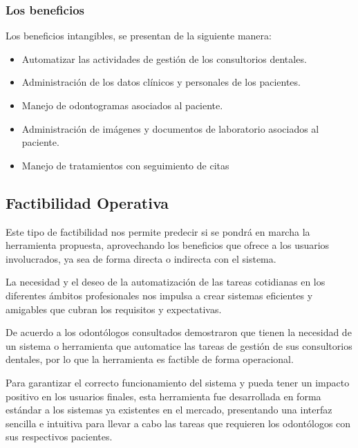 \subsubsection{Los beneficios}
\noindent
Los beneficios intangibles, se presentan de la siguiente manera:
\begin{itemize}
    \item Automatizar las actividades de gestión de los consultorios dentales.
    \item Administración de los datos clínicos y personales de los pacientes.
    \item Manejo de odontogramas asociados al paciente.
    \item Administración de imágenes y documentos de laboratorio asociados al paciente.
    \item Manejo de tratamientos con seguimiento de citas
\end{itemize}

\subsection{Factibilidad Operativa}
\noindent
Este tipo de factibilidad nos permite predecir si se pondrá en marcha la herramienta propuesta, aprovechando los beneficios que ofrece a los usuarios involucrados, ya sea de forma directa o indirecta con el sistema.

\vspace{1em}

La necesidad y el deseo de la automatización de las tareas cotidianas en los diferentes ámbitos profesionales nos impulsa a crear sistemas eficientes y amigables que cubran los requisitos y expectativas.

\vspace{1em}

De acuerdo a los odontólogos consultados demostraron que tienen la necesidad de un sistema o herramienta que automatice las tareas de gestión de sus consultorios dentales, por lo que la herramienta es factible de forma operacional.

\vspace{1em}

Para garantizar el correcto funcionamiento del sistema y pueda tener un impacto positivo en los usuarios finales, esta herramienta fue desarrollada en forma estándar a los sistemas ya existentes en el mercado, presentando una interfaz sencilla e intuitiva para llevar a cabo las tareas que requieren los odontólogos con sus respectivos pacientes.


